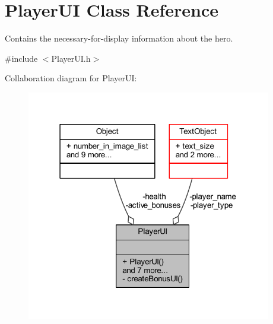 \hypertarget{class_player_u_i}{}\section{Player\+UI Class Reference}
\label{class_player_u_i}


Contains the necessary-\/for-\/display information about the hero.  




{\ttfamily \#include $<$Player\+U\+I.\+h$>$}



Collaboration diagram for Player\+UI\+:
\nopagebreak
\begin{figure}[H]
\begin{center}
\leavevmode
\includegraphics[width=303pt]{class_player_u_i__coll__graph}
\end{center}
\end{figure}
